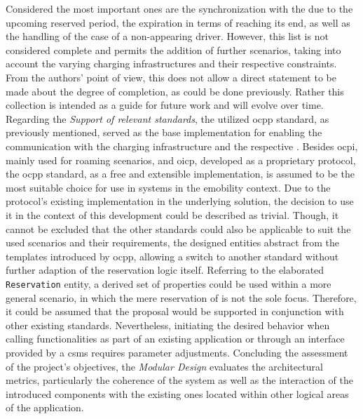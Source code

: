 Considered the most important ones are the synchronization with the  due to the upcoming reserved period, the expiration in terms of reaching its end, as well as the handling of the case of a non-appearing driver.
However, this list is not considered complete and permits the addition of further scenarios, taking into account the varying charging infrastructures and their respective constraints. 
From the authors' point of view, this does not allow a direct statement to be made about the degree of completion, as could be done previously. Rather this collection is intended as a guide for future work and will evolve over time.
Regarding the \textit{Support of relevant standards}, the utilized \acrshort{ocpp} standard, as previously mentioned, served as the base implementation for enabling the communication with the charging infrastructure and the respective .
Besides \acrshort{ocpi}, mainly used for roaming scenarios, and \acrshort{oicp}, developed as a proprietary protocol, the \acrshort{ocpp} standard, as a free and extensible implementation, is assumed to be the most suitable choice for use in systems in the \acrshort{emobility} context.
Due to the protocol's existing implementation in the underlying solution, the decision to use it in the context of this development could be described as trivial.
Though, it cannot be excluded that the other standards could also be applicable to suit the used scenarios and their requirements, the designed entities abstract from the templates introduced by \acrshort{ocpp}, allowing a switch to another standard without further adaption of the reservation logic itself.
Referring to the elaborated \texttt{Reservation} entity, a derived set of properties could be used within a more general scenario, in which the mere reservation of  is not the sole focus. Therefore, it could be assumed that the proposal would be supported in conjunction with other existing standards. 
Nevertheless, initiating the desired behavior when calling functionalities as part of an existing application or through an interface provided by a \acrshort{csms} requires parameter adjustments.
Concluding the assessment of the project's objectives, the \textit{Modular Design} evaluates the architectural metrics, particularly the coherence of the system as well as the interaction of the introduced components with the existing ones located within other logical areas of the application.
